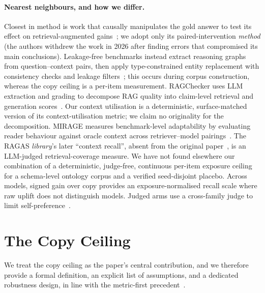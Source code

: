 \documentclass[10pt,twocolumn]{article}
\begin{document}
\paragraph{Nearest neighbours, and how we differ.}
Closest in method is work that causally manipulates the gold answer to test its effect on retrieval-augmented gains~\cite{answerpresence2026}; we adopt only its paired-intervention \emph{method} (the authors withdrew the work in 2026 after finding errors that compromised its main conclusions). Leakage-free benchmarks instead extract reasoning graphs from question--context pairs, then apply type-constrained entity replacement with consistency checks and leakage filters~\cite{seedrg2026}; this occurs during corpus construction, whereas the copy ceiling is a per-item measurement. RAGChecker uses LLM extraction and grading to decompose RAG quality into claim-level retrieval and generation scores~\cite{ragchecker2024}. Our context utilisation is a deterministic, surface-matched version of its context-utilisation metric; we claim no originality for the decomposition. MIRAGE measures benchmark-level adaptability by evaluating reader behaviour against oracle context across retriever--model pairings~\cite{mirage2025}. The RAGAS \emph{library}'s later ``context recall'', absent from the original paper~\cite{es2023ragas}, is an LLM-judged retrieval-coverage measure. We have not found elsewhere our combination of a deterministic, judge-free, continuous per-item exposure ceiling for a schema-level ontology corpus and a verified seed-disjoint placebo. Across models, signed gain over copy provides an exposure-normalised recall scale where raw uplift does not distinguish models. Judged arms use a cross-family judge to limit self-preference~\cite{zheng2023judging,panickssery2024selfpreference}.



\section{The Copy Ceiling}\label{sec:ceiling}
We treat the copy ceiling as the paper's central contribution, and we therefore provide a formal definition, an explicit list of assumptions, and a dedicated robustness design, in line with the metric-first precedent~\cite{min2023factscore,gao2023alce}.
\end{document}
